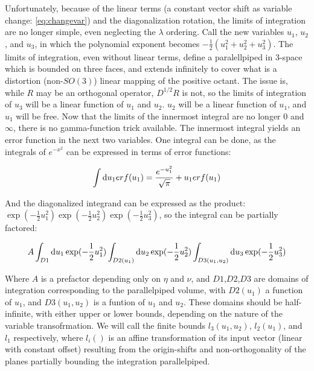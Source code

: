 \documentclass[10pt,letterpaper]{article}
\def\d{{\rm d}}  %
\begin{document}
Unfortunately, because of the linear terms (a constant vector shift as variable change: \ref{eq:changevar}) and the diagonalization rotation, the limits of integration are no longer simple, even neglecting the $\lambda$ ordering. Call the new variables $u_1$, $u_2$, and $u_3$, in which the polynomial exponent becomes $-\frac{1}{2}(u_1^2 + u_2^2 + u_3^2)$. The limits of integration, even without linear terms, define a paralellpiped in 3-space which is bounded on three faces, and extends infinitely to cover what is a distortion (non-$SO(3)$) linear mapping of the positive octant. The issue is, while $R$ may be an orthogonal operator, $D^{1/2}R$ is not, so the limits of integration of $u_3$ will be a linear function of $u_1$ and $u_2$. $u_2$ will be a linear function of $u_1$, and $u_1$ will be free. Now that the limits of the innermost integral are no longer $0$ and $\infty$, there is no gamma-function trick available.  The innermost integral yields an error function in the next two variables. One integral can be done, as the integrals of $e^{-x^2}$ can be expressed in terms of error functions:

\begin{equation} \label{eq:erfint}
\int \d u_1 erf(u_1) = \frac{e^{-u_1^2}}{\sqrt{\pi}} + u_1 erf(u_1)
\end{equation}

And the diagonalized integrand can be expressed as the product: $\exp(-\frac{1}{2} u_1^2) \exp(-\frac{1}{2} u_2^2) \exp(-\frac{1}{2} u_3^2)$, so the integral can be partially factored:

\begin{equation} \label{eq:gausnest}
A \int_{D1} \d u_1 \exp(-\frac{1}{2} u_1^2) \int_{D2(u_1)} \d u_2 \exp(-\frac{1}{2} u_2^2) \int_{D3(u_1,u_2)} \d u_3 \exp(-\frac{1}{2} u_3^2)
\end{equation}

Where $A$ is a prefactor depending only on $\eta$ and $\nu$, and $D1$,$D2$,$D3$ are domains of integration corresponding to the parallelpiped volume, with $D2(u_1)$ a function of $u_1$, and $D3(u_1,u_2)$ is a funtion of $u_1$ and $u_2$. These domains should be half-infinite, with either upper or lower bounds, depending on the nature of the variable transofrmation. We will call the finite bounds $l_3(u_1,u_2)$, $l_2(u_1)$, and $l_1$ respectively, where $l_i()$ is an affine transformation of its input vector (linear with constant offset) resulting from the origin-shifts and non-orthogonality of the planes partially bounding the integration parallelpiped.
\end{document}
